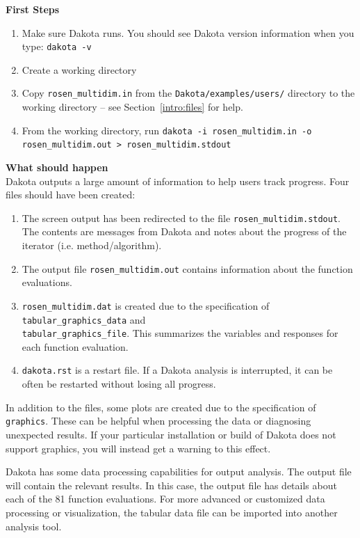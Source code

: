 {\bf First Steps}
\begin{enumerate}
  \item Make sure Dakota runs. You should see Dakota version information
   when you type: \texttt{dakota -v}
  \item Create a working directory 
  \item Copy \texttt{rosen\_multidim.in} from the \texttt{Dakota/examples/users/}
    directory to the working directory -- see Section~\ref{intro:files} for help.
  \item From the working directory, run \texttt{dakota -i 
    rosen\_multidim.in -o rosen\_multidim.out > rosen\_multidim.stdout}
\end{enumerate}

{\bf What should happen} \\
Dakota outputs a large amount of information to help users track  progress. 
Four files should have been created:
\begin{enumerate}
  \item The screen output has been redirected to the file 
\texttt{rosen\_multidim.stdout}. \\
  The contents are messages from Dakota and notes about the 
progress of the iterator (i.e. method/algorithm).
  \item The output file \texttt{rosen\_multidim.out} 
contains information about the function evaluations.
  \item \texttt{rosen\_multidim.dat} is created due to the 
specification of \texttt{tabular\_graphics\_data} and \\
\texttt{tabular\_graphics\_file}. This summarizes 
the variables and responses for each function evaluation.
  \item \texttt{dakota.rst} is a restart file. If a Dakota 
analysis is interrupted, it can be often be restarted without 
losing all progress.
\end{enumerate}
In addition to the files, some plots are created due to the specification
of \texttt{graphics}. These can be helpful when processing the data or
diagnosing unexpected results.  If your particular installation or build
of Dakota does not support graphics, you will instead get a warning to
this effect.

Dakota has some data processing capabilities for output analysis. 
The output file will contain the relevant results. 
In this case, the output file has details
about each of the 81 function evaluations. 
For more advanced or customized data 
processing or visualization, the tabular data file can be imported into 
another analysis tool. 

